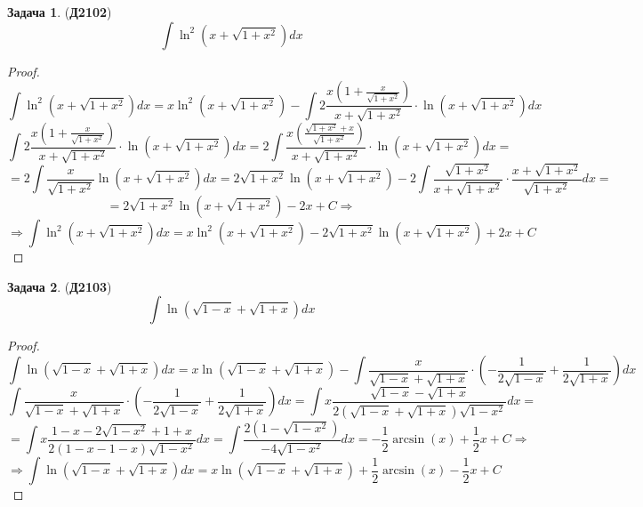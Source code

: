 \documentclass[12pt]{article}
\theoremstyle{definition}
\newtheorem{problem}{Задача}
\DeclareMathOperator{\dint}{\displaystyle\int}
\begin{document}
\begin{problem}(\textbf{Д2102})
	$$
		\dint \ln^2(x + \sqrt{1 +x^2})dx
	$$
\end{problem}
\begin{proof}
	$$
		\dint \ln^2(x + \sqrt{1 +x^2})dx = x \ln^2(x + \sqrt{1 +x^2}) - \dint 2\dfrac{x\left(1 + \tfrac{x}{\sqrt{1 + x^2}}\right)}{x + \sqrt{1 + x^2}}{\cdot}\ln(x + \sqrt{1 +x^2})dx
	$$
	$$
		\dint 2\dfrac{x\left(1 + \tfrac{x}{\sqrt{1 + x^2}}\right)}{x + \sqrt{1 + x^2}}{\cdot}\ln(x + \sqrt{1 +x^2})dx = 2\dint \dfrac{x\left( \tfrac{\sqrt{1+x^2} + x}{\sqrt{1 + x^2}}\right)}{x + \sqrt{1 + x^2}}{\cdot}\ln(x + \sqrt{1 +x^2})dx = 
	$$
	$$
		= 2 \dint \dfrac{x}{\sqrt{1 + x^2}}\ln(x + \sqrt{1 + x^2})dx = 2\sqrt{1 + x^2}\ln(x + \sqrt{1 + x^2}) - 2\dint \dfrac{\sqrt{1 + x^2}}{x + \sqrt{1 +x^2}}{\cdot}\dfrac{x + \sqrt{1 + x^2}}{\sqrt{1 + x^2}}dx =
	$$
	$$
		=	2\sqrt{1 + x^2}\ln(x + \sqrt{1 + x^2}) - 2x + C \Rightarrow
	$$
	$$
		\Rightarrow \dint \ln^2(x + \sqrt{1 +x^2})dx = x \ln^2(x + \sqrt{1 +x^2}) - 2\sqrt{1 + x^2}\ln(x + \sqrt{1 + x^2}) + 2x + C
	$$
\end{proof}
\begin{problem}(\textbf{Д2103})
	$$
		\dint \ln(\sqrt{1-x} + \sqrt{1+x})dx
	$$
\end{problem}
\begin{proof}
	$$
		\dint \ln(\sqrt{1-x} + \sqrt{1+x})dx = x \ln(\sqrt{1-x} + \sqrt{1+x}) - \dint \dfrac{x}{\sqrt{1-x} + \sqrt{1 +x}}{\cdot}\left(-\dfrac{1}{2\sqrt{1-x}} + \dfrac{1}{2\sqrt{1+x}}\right)dx
	$$
	$$
		\dint \dfrac{x}{\sqrt{1-x} + \sqrt{1 +x}}{\cdot}\left(-\dfrac{1}{2\sqrt{1-x}} + \dfrac{1}{2\sqrt{1+x}}\right)dx = \dint x\dfrac{\sqrt{1 - x} - \sqrt{1+x}}{2(\sqrt{1-x} + \sqrt{1+x})\sqrt{1-x^2}}dx =
	$$
	$$
		=	\dint x\dfrac{1 - x - 2\sqrt{1 -x^2} + 1 + x}{2(1 -x - 1 -x)\sqrt{1-x^2}}dx = \dint \dfrac{2(1 - \sqrt{1-x^2})}{-4\sqrt{1-x^2}}dx = - \dfrac{1}{2}\arcsin(x) + \dfrac{1}{2}x+ C \Rightarrow
	$$
	$$
		\Rightarrow \dint \ln(\sqrt{1-x} + \sqrt{1+x})dx =  x \ln(\sqrt{1-x} + \sqrt{1+x})  + \dfrac{1}{2}\arcsin(x) - \dfrac{1}{2}x+ C
	$$
\end{proof}
\end{document}
